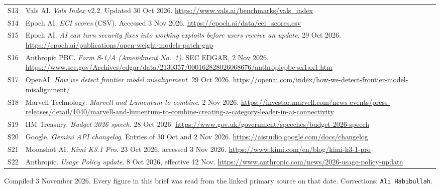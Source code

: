\documentclass[11pt,a4paper]{article}
\newcommand{\briefdate}{3 November 2026}            %
\newcommand{\briefauthor}{Ali Habibullah}          %
\begin{document}
{\begin{tabularx}{\textwidth}{@{}l X@{}}
S13 & Vals AI. \emph{Vals Index} v2.2. Updated 30 Oct 2026. \url{https://www.vals.ai/benchmarks/vals_index} \\
S14 & Epoch AI. \emph{ECI scores} (CSV). Accessed 3 Nov 2026. \url{https://epoch.ai/data/eci_scores.csv} \\
S15 & Epoch AI. \emph{AI can turn security fixes into working exploits before users receive an update}. 29 Oct 2026. \url{https://epoch.ai/publications/open-weight-models-patch-gap} \\
S16 & Anthropic PBC. \emph{Form S-1/A (Amendment No.\ 1)}. SEC EDGAR, 2 Nov 2026. \url{https://www.sec.gov/Archives/edgar/data/2130357/000162828026068676/anthropicpbc-sx1ax1.htm} \\
S17 & OpenAI. \emph{How we detect frontier model misalignment}. 29 Oct 2026. \url{https://openai.com/index/how-we-detect-frontier-model-misalignment/} \\
S18 & Marvell Technology. \emph{Marvell and Lumentum to combine}. 2 Nov 2026. \url{https://investor.marvell.com/news-events/press-releases/detail/1040/marvell-and-lumentum-to-combine-creating-a-category-leader-in-ai-connectivity} \\
S19 & HM Treasury. \emph{Budget 2026 speech}. 28 Oct 2026. \url{https://www.gov.uk/government/speeches/budget-2026-speech} \\
S20 & Google. \emph{Gemini API changelog}. Entries of 30 Oct and 2 Nov 2026. \url{https://aistudio.google.com/docs/changelog} \\
S21 & Moonshot AI. \emph{Kimi K3.1 Pro}. 23 Oct 2026, accessed 3 Nov 2026. \url{https://www.kimi.com/en/blog/kimi-k3-1-pro} \\
S22 & Anthropic. \emph{Usage Policy update}. 8 Oct 2026, effective 12 Nov. \url{https://www.anthropic.com/news/2026-usage-policy-update} \\
\bottomrule
\end{tabularx}}

\vspace{0.4em}
{\footnotesize\color{brandgrey}
Compiled \briefdate. Every figure in this brief was read from the linked primary
source on that date. Corrections: \texttt{\briefauthor}.}
\end{document}
